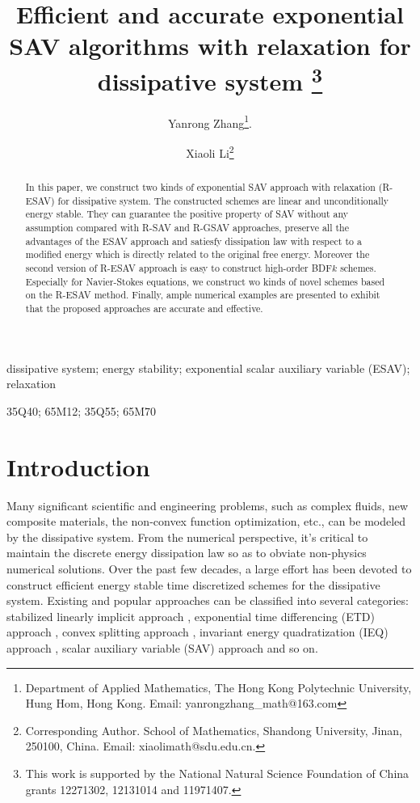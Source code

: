\documentclass[final,review,onefignum,onetabnum]{siamart190516}
\title{ Efficient and accurate exponential SAV algorithms with relaxation for dissipative system
\thanks{This work is supported by the National Natural Science Foundation of China  grants  12271302, 12131014 and 11971407.}
}
\author{Yanrong Zhang\thanks{ Department of Applied Mathematics, The Hong Kong Polytechnic University, Hung Hom, Hong Kong. Email: yanrongzhang\_math@163.com}.
       \and Xiaoli Li\thanks{Corresponding Author. School of Mathematics, Shandong University, Jinan, 250100, China. Email: xiaolimath@sdu.edu.cn.}}
\theoremstyle{plain}
\begin{document}
\maketitle

\begin{abstract}
In this paper, we construct two kinds of exponential SAV approach with relaxation (R-ESAV) for dissipative system. The constructed schemes are linear and unconditionally energy stable. They can guarantee the positive property of SAV without any assumption compared with R-SAV and R-GSAV approaches, preserve all the advantages of the ESAV approach and satiesfy dissipation law with respect to  a modified energy which is directly related to the original free energy. Moreover  the second version of R-ESAV approach is easy to construct high-order BDF$k$ schemes. Especially for Navier-Stokes equations, we construct wo kinds of novel schemes based on the R-ESAV method.  Finally, ample numerical examples are presented to exhibit that the proposed approaches are accurate and effective.


\end{abstract}

\begin{keywords} 
dissipative system; energy stability; exponential scalar auxiliary variable (ESAV); relaxation
\end{keywords}

\begin{AMS} 35Q40;  65M12; 35Q55; 65M70  \end{AMS}

\pagestyle{myheadings}
\thispagestyle{plain}


 \section{Introduction} 
 \label{sec:Intro}
Many significant scientific and engineering problems, such as complex fluids, new composite materials, the non-convex function optimization, etc., can be modeled by the 
dissipative system. From the numerical perspective, it's critical to maintain the discrete energy dissipation law so as to obviate non-physics numerical solutions. 
Over the past few decades, a large effort has been devoted to construct efficient energy stable time discretized schemes for the dissipative system. 
Existing and popular approaches can be classified into several categories: stabilized linearly implicit approach \cite{zhu1999coarsening, shen2010numerical}, exponential time differencing (ETD) approach \cite{wang2016efficient, du2019maximum, du2021maximum}, convex splitting approach \cite{elliott1993global, eyre1998unconditionally, shen2012second, baskaran2013convergence}, invariant energy quadratization (IEQ) approach \cite{yang2016linear, yang2017efficient, yang2018efficient, SheY20}, scalar auxiliary variable (SAV) approach \cite{shen2018scalar, shen2018convergence, shen2019new} and so on. 
\end{document}

